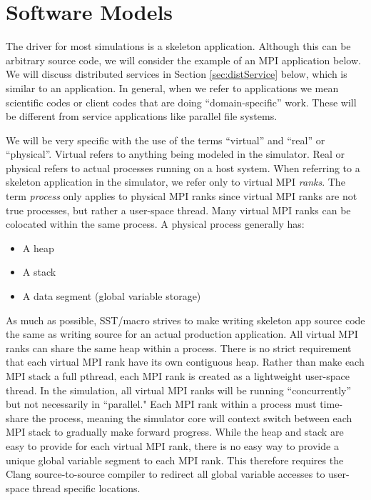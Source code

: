 
\chapter{Software Models}
\label{chapter:software}

The driver for most simulations is a skeleton application.
Although this can be arbitrary source code, we will consider the example of an MPI application below.
We will discuss distributed services in Section \ref{sec:distService} below, which is similar to an application.  In general, when we refer to applications we mean scientific codes or client codes that are doing ``domain-specific'' work.  These will be different from service applications like parallel file systems.

We will be very specific with the use of the terms ``virtual'' and ``real'' or ``physical''.  
Virtual refers to anything being modeled in the simulator. 
Real or physical refers to actual processes running on a host system.
When referring to a skeleton application in the simulator, we refer only to virtual MPI \emph{ranks}.
The term \emph{process} only applies to physical MPI ranks since virtual MPI ranks are not true processes, 
but rather a user-space thread.  
Many virtual MPI ranks can be colocated within the same process. A physical process generally has:
\begin{itemize}
\item A heap
\item A stack
\item A data segment (global variable storage)
\end{itemize}

As much as possible, SST/macro strives to make writing skeleton app source code the same as writing source for an actual production application.
All virtual MPI ranks can share the same heap within a process.
There is no strict requirement that each virtual MPI rank have its own contiguous heap.
Rather than make each MPI stack a full pthread, each MPI rank is created as a lightweight user-space thread.
In the simulation, all virtual MPI ranks will be running ``concurrently'' but not necessarily in ``parallel."
Each MPI rank within a process must time-share the process,
meaning the simulator core will context switch between each MPI stack to gradually make forward progress.
While the heap and stack are easy to provide for each virtual MPI rank,
there is no easy way to provide a unique global variable segment to each MPI rank.
This therefore requires the Clang source-to-source compiler to redirect all global variable accesses to user-space thread specific locations.

